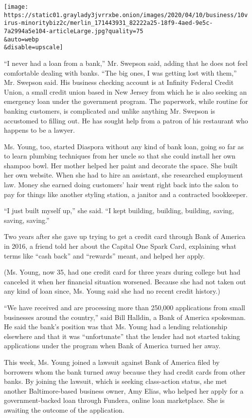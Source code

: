 \texttt{[image: https://static01.graylady3jvrrxbe.onion/images/2020/04/10/business/10virus-minoritybiz2c/merlin\_171443931\_82222a25-18f9-4aed-9e5c-7a2994a5e104-articleLarge.jpg?quality=75\\\&auto=webp\\\&disable=upscale]}

``I never had a loan from a bank,'' Mr. Swepson said, adding that he
does not feel comfortable dealing with banks. ``The big ones, I was
getting lost with them,'' Mr. Swepson said. His business checking
account is at Infinity Federal Credit Union, a small credit union based
in New Jersey from which he is also seeking an emergency loan under the
government program. The paperwork, while routine for banking customers,
is complicated and unlike anything Mr. Swepson is accustomed to filling
out. He has sought help from a patron of his restaurant who happens to
be a lawyer.

Ms. Young, too, started Diaspora without any kind of bank loan, going so
far as to learn plumbing techniques from her uncle so that she could
install her own shampoo bowl. Her mother helped her paint and decorate
the space. She built her own website. When she had to hire an assistant,
she researched employment law. Money she earned doing customers' hair
went right back into the salon to pay for things like another styling
station, a janitor and a contracted bookkeeper.

``I just built myself up,'' she said. ``I kept building, building,
building, saving, saving, saving.''

Two years after she gave up trying to get a credit card through Bank of
America in 2016, a friend told her about the Capital One Spark Card,
explaining what terms like ``cash back'' and ``rewards'' meant, and
helped her apply.

(Ms. Young, now 35, had one credit card for three years during college
but had canceled it when her financial situation worsened. Because she
had not taken out any kind of loan since, Ms. Young said she had no
recent credit history.)

``We have received and are processing more than 250,000 applications
from small businesses around the country,'' said Bill Halldin, a Bank of
America spokesman. He said the bank's position was that Ms. Young had a
lending relationship elsewhere and that it was ``unfortunate'' that the
lender had not started taking applications under the program when Bank
of America turned her away.

This week, Ms. Young joined a lawsuit against Bank of America filed by
borrowers whom the bank turned away because they had credit cards from
other banks. By joining the lawsuit, which is seeking class-action
status, she met another Baltimore-based business owner, Amy Elias, who
helped her apply for a government-backed loan through Fundera, online
loan marketplace. She is awaiting the outcome of the application.


